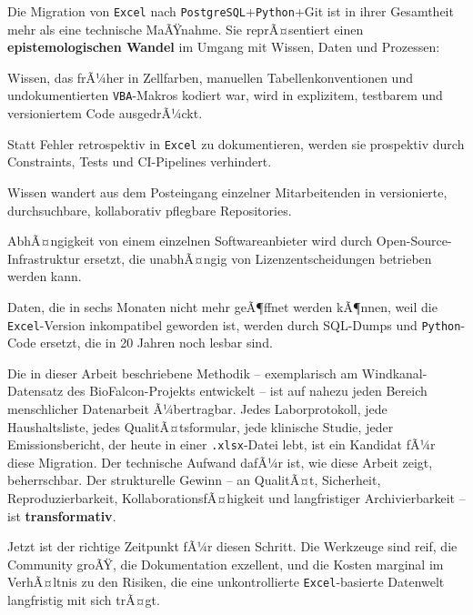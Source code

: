 ﻿\documentclass[12pt,a4paper]{report}
\theoremstyle{definition}
\theoremstyle{remark}
\newcommand{\excel}{\texttt{Excel}}
\newcommand{\vba}{\texttt{VBA}}
\newcommand{\pg}{\texttt{PostgreSQL}}
\newcommand{\py}{\texttt{Python}}
\newcommand{\code}[1]{\texttt{#1}}
\begin{document}
Die Migration von \excel{} nach \pg{}+\py{}+Git ist in ihrer Gesamtheit
mehr als eine technische MaÃŸnahme.
Sie reprÃ¤sentiert einen \textbf{epistemologischen Wandel} im Umgang
mit Wissen, Daten und Prozessen:

\begin{description}[leftmargin=2em, itemsep=6pt]
  \item[\textbf{Von implizit zu explizit:}]
        Wissen, das frÃ¼her in Zellfarben, manuellen
        Tabellenkonventionen und undokumentierten \vba-Makros
        kodiert war, wird in explizitem, testbarem und
        versioniertem Code ausgedrÃ¼ckt.
  \item[\textbf{Von reaktiv zu prÃ¤diktiv:}]
        Statt Fehler retrospektiv in \excel{} zu dokumentieren,
        werden sie prospektiv durch Constraints, Tests und
        CI-Pipelines verhindert.
  \item[\textbf{Von silo-basiert zu kollaborativ:}]
        Wissen wandert aus dem Posteingang einzelner Mitarbeitenden
        in versionierte, durchsuchbare, kollaborativ pflegbare
        Repositories.
  \item[\textbf{Von proprietÃ¤r zu souverÃ¤n:}]
        AbhÃ¤ngigkeit von einem einzelnen Softwareanbieter wird durch
        Open-Source-Infrastruktur ersetzt, die unabhÃ¤ngig von
        Lizenzentscheidungen betrieben werden kann.
  \item[\textbf{Von ephemer zu archivierbar:}]
        Daten, die in sechs Monaten nicht mehr geÃ¶ffnet werden kÃ¶nnen,
        weil die \excel-Version inkompatibel geworden ist, werden durch
        SQL-Dumps und \py-Code ersetzt, die in 20 Jahren noch lesbar sind.
\end{description}

Die in dieser Arbeit beschriebene Methodik -- exemplarisch am
Windkanal-Datensatz des BioFalcon-Projekts entwickelt -- ist auf
nahezu jeden Bereich menschlicher Datenarbeit Ã¼bertragbar.
Jedes Laborprotokoll, jede Haushaltsliste, jedes QualitÃ¤tsformular,
jede klinische Studie, jeder Emissionsbericht, der heute in einer
\code{.xlsx}-Datei lebt, ist ein Kandidat fÃ¼r diese Migration.
Der technische Aufwand dafÃ¼r ist, wie diese Arbeit zeigt, beherrschbar.
Der strukturelle Gewinn -- an QualitÃ¤t, Sicherheit, Reproduzierbarkeit,
KollaborationsfÃ¤higkeit und langfristiger Archivierbarkeit -- ist
\textbf{transformativ}.

\medskip

Jetzt ist der richtige Zeitpunkt fÃ¼r diesen Schritt.
Die Werkzeuge sind reif, die Community groÃŸ, die Dokumentation
exzellent, und die Kosten marginal im VerhÃ¤ltnis zu den Risiken,
die eine unkontrollierte \excel-basierte Datenwelt langfristig
mit sich trÃ¤gt.
\end{document}
